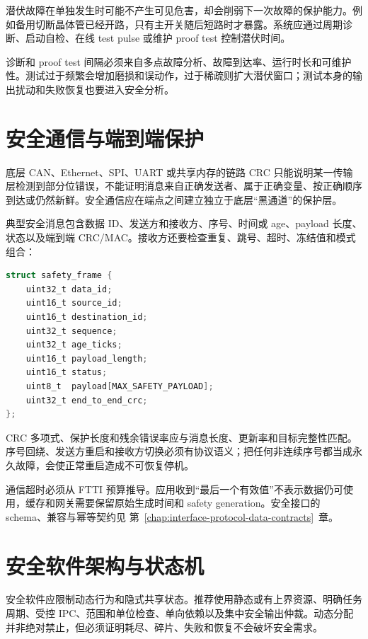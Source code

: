 潜伏故障在单独发生时可能不产生可见危害，却会削弱下一次故障的保护能力。例如备用切断晶体管已经开路，只有主开关随后短路时才暴露。系统应通过周期诊断、启动自检、在线 test pulse 或维护 proof test 控制潜伏时间。

诊断和 proof test 间隔必须来自多点故障分析、故障到达率、运行时长和可维护性。测试过于频繁会增加磨损和误动作，过于稀疏则扩大潜伏窗口；测试本身的输出扰动和失败恢复也要进入安全分析。

\section{安全通信与端到端保护}

底层 CAN、Ethernet、SPI、UART 或共享内存的链路 CRC 只能说明某一传输层检测到部分位错误，不能证明消息来自正确发送者、属于正确变量、按正确顺序到达或仍然新鲜。安全通信应在端点之间建立独立于底层“黑通道”的保护层。

典型安全消息包含数据 ID、发送方和接收方、序号、时间或 age、payload 长度、状态以及端到端 CRC/MAC。接收方还要检查重复、跳号、超时、冻结值和模式组合：

\noindent\begin{minipage}{\textwidth}
\begin{lstlisting}[language=C,caption={安全通信封装的逻辑字段（示意）}]
struct safety_frame {
    uint32_t data_id;
    uint16_t source_id;
    uint16_t destination_id;
    uint32_t sequence;
    uint32_t age_ticks;
    uint16_t payload_length;
    uint16_t status;
    uint8_t  payload[MAX_SAFETY_PAYLOAD];
    uint32_t end_to_end_crc;
};
\end{lstlisting}
\end{minipage}

CRC 多项式、保护长度和残余错误率应与消息长度、更新率和目标完整性匹配。序号回绕、发送方重启和接收方切换必须有协议语义；把任何非连续序号都当成永久故障，会使正常重启造成不可恢复停机。

通信超时必须从 FTTI 预算推导。应用收到“最后一个有效值”不表示数据仍可使用，缓存和网关需要保留原始生成时间和 safety generation。安全接口的 schema、兼容与幂等契约见 \mbox{第~\ref{chap:interface-protocol-data-contracts}~章}。

\section{安全软件架构与状态机}

安全软件应限制动态行为和隐式共享状态。推荐使用静态或有上界资源、明确任务周期、受控 IPC、范围和单位检查、单向依赖以及集中安全输出仲裁。动态分配并非绝对禁止，但必须证明耗尽、碎片、失败和恢复不会破坏安全需求。

